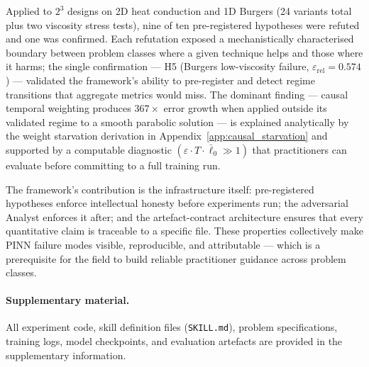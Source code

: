\documentclass{article}
\newcommand{\relL}{\varepsilon_{\mathrm{rel}}}
\begin{document}
Applied to $2^3$ designs on 2D heat conduction and 1D Burgers (24 variants
total plus two viscosity stress tests), nine of ten pre-registered hypotheses
were refuted and one was confirmed.
Each refutation exposed a mechanistically characterised boundary between
problem classes where a given technique helps and those where it harms;
the single confirmation — H5 (Burgers low-viscosity failure, $\relL=0.574$)
— validated the framework's ability to pre-register and detect regime
transitions that aggregate metrics would miss.
The dominant finding — causal temporal weighting produces $367\times$
error growth when applied outside its validated regime to a smooth
parabolic solution — is explained analytically by the weight starvation
derivation in Appendix~\ref{app:causal_starvation} and supported by a
computable diagnostic $(\varepsilon\cdot T\cdot\bar\ell_0 \gg 1)$ that
practitioners can evaluate before committing to a full training run.

The framework's contribution is the infrastructure itself: pre-registered
hypotheses enforce intellectual honesty before experiments run; the
adversarial Analyst enforces it after; and the artefact-contract architecture
ensures that every quantitative claim is traceable to a specific file.
These properties collectively make PINN failure modes visible, reproducible,
and attributable — which is a prerequisite for the field to build reliable
practitioner guidance across problem classes.

\paragraph{Supplementary material.}
All experiment code, skill definition files (\texttt{SKILL.md}), problem specifications,
training logs, model checkpoints, and evaluation artefacts are provided in the supplementary information.

\end{document}
